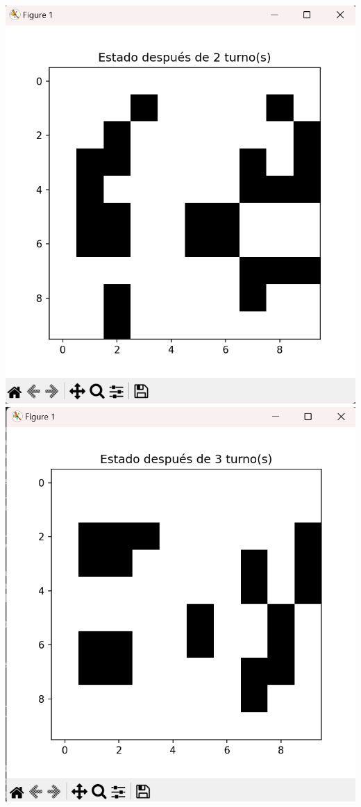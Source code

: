 \begin{enumerate}
\begin{itemize}
\begin{center}
    \includegraphics[scale=0.4]{Practica05/IMA/ejemplosJuegoVida/ejemplo 1.3.png}
    \includegraphics[scale=0.4]{Practica05/IMA/ejemplosJuegoVida/ejemplo 1.4.png}

\end{center}
\end{itemize}
\end{enumerate}
